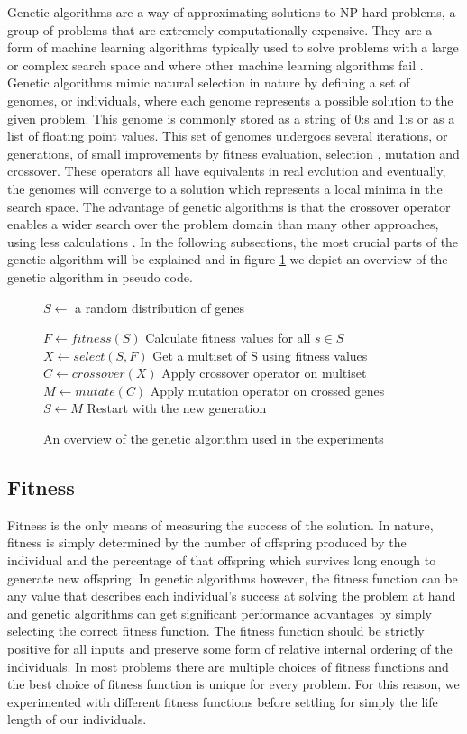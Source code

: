 \documentclass[a4paper,11pt]{kth-mag}
\begin{document}
Genetic algorithms are a way of approximating solutions to NP-hard problems, a group of problems that are extremely computationally expensive. They are a form of machine learning algorithms typically used to solve problems with a large or complex search space and where other machine learning algorithms fail \cite{marsland}. Genetic algorithms mimic natural selection in nature by defining a set of genomes, or individuals, where each genome represents a possible solution to the given problem. This genome is commonly stored as a string of 0:s and 1:s or as a list of floating point values. This set of genomes undergoes several iterations, or generations, of small improvements by fitness evaluation, selection , mutation and crossover. These operators all have equivalents in real evolution and eventually, the genomes will converge to a solution which represents a local minima in the search space. The advantage of genetic algorithms is that the crossover operator enables a wider search over the problem domain than many other approaches, using less calculations \cite{holland}. In the following subsections, the most crucial parts of the genetic algorithm will be explained and in figure \ref{algorithm-overview} we depict an overview of the genetic algorithm in pseudo code.

\begin{figure}
\begin{algorithmic}
\State $ S \gets $ a random distribution of genes

        \State $F\gets fitness(S)$
		\Comment Calculate fitness values for all $s \in S$
		\State $X \gets select(S,F)$
		\Comment Get a multiset of S using fitness values
		\State $C \gets crossover(X)$
		\Comment Apply crossover operator on multiset
		\State $M \gets mutate(C)$
		\Comment Apply mutation operator on crossed genes
		\State $S \gets M$
		\Comment Restart with the new generation
    \EndWhile
\end{algorithmic}
\caption{An overview of the genetic algorithm used in the experiments}
\label{algorithm-overview}
\end{figure}

\subsection{Fitness}
Fitness is the only means of measuring the success of the solution. In nature, fitness is simply determined by the number of offspring produced by the individual and the percentage of that offspring which survives long enough to generate new offspring. In genetic algorithms however, the fitness function can be any value that describes each individual's success at solving the problem at hand \cite{marsland} and genetic algorithms can get significant performance advantages by simply selecting the correct fitness function. The fitness function should be strictly positive for all inputs and preserve some form of relative internal ordering of the individuals. In most problems there are multiple choices of fitness functions and the best choice of fitness function is unique for every problem. For this reason, we experimented with different fitness functions before settling for simply the life length of our individuals.
\end{document}
